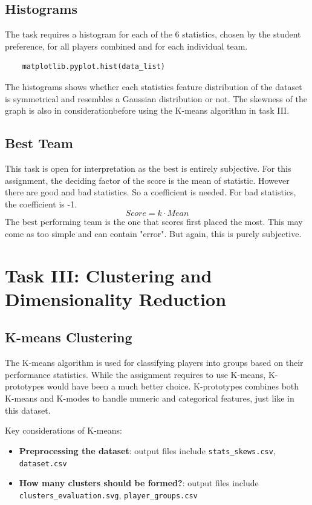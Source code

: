 \documentclass{report}
\begin{document}
\subsection{Histograms}
The task requires a histogram for each of the 6 statistics, chosen by the student preference, for all
players combined and for each individual team.
\begin{verbatim}
    matplotlib.pyplot.hist(data_list)
\end{verbatim}
The histograms shows whether each statistics feature distribution of the dataset is symmetrical 
and resembles a Gaussian distribution or not. The skewness of the graph is also in considerationbefore 
using the K-means algorithm in task III. 

\subsection{Best Team}
This task is open for interpretation as the best is entirely subjective. For this assignment, the 
deciding factor of the score is the mean of statistic. However there are good and bad statistics. 
So a coefficient is needed. For bad statistics, the coefficient is -1.
\[Score = k \cdot Mean\]
The best performing team is the one that scores first placed the most.
This may come as too simple and can contain "error". But again, this is purely subjective.

\section{Task III: Clustering and Dimensionality Reduction}
\subsection{K-means Clustering}
The K-means algorithm is used for classifying players into groups based on their performance statistics.
While the assignment requires to use K-means, K-prototypes would have been a much better choice.
K-prototypes combines both K-means and K-modes to handle numeric and categorical features, just
like in this dataset. 

Key considerations of K-means:
\begin{itemize}
    \item \textbf{Preprocessing the dataset}: output files include \verb|stats_skews.csv|, 
    \verb|dataset.csv|
    \item \textbf{How many clusters should be formed?}: output files include 
    \verb|clusters_evaluation.svg|, \verb|player_groups.csv|
\end{itemize}
\end{document}
